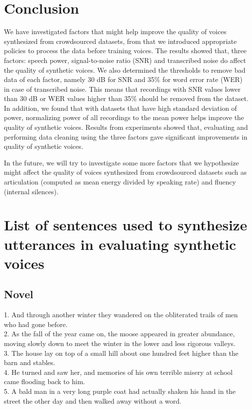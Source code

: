 \documentclass[12pt]{article}
\begin{document}
\section{Conclusion}\label{sec_conclusion}
We have investigated factors that might help improve the quality of voices synthesized from crowdsourced datasets, from that we introduced appropriate policies to process the data before training voices. The results showed that, three factors: speech power, signal-to-noise ratio (SNR) and transcribed noise do affect the quality of synthetic voices. We also determined the thresholds to remove bad data of each factor, namely 30 dB for SNR and 35\% for word error rate (WER) in case of transcribed noise. This means that recordings with SNR values lower than 30 dB or WER values higher than 35\% should be removed from the dataset. In addition, we found that with datasets that have high standard deviation of power, normalizing power of all recordings to the mean power helps improve the quality of synthetic voices. Results from experiments showed that, evaluating and performing data cleaning using the three factors gave significant improvements in quality of synthetic voices.

In the future, we will try to investigate some more factors that we hypothesize might affect the quality of voices synthesized from crowdsourced datasets such as articulation (computed as mean energy divided by speaking rate) and fluency (internal silences).

\clearpage
\appendix
\setcounter{secnumdepth}{0}
\section{List of sentences used to synthesize utterances in evaluating synthetic voices}\label{sec_appendix}

\subsection{Novel}
1.	And through another winter they wandered on the obliterated trails of men who had gone before.\\
2.	As the fall of the year came on, the moose appeared in greater abundance, moving slowly down to meet the winter in the lower and less rigorous valleys.\\
3.	The house lay on top of a small hill about one hundred feet higher than the barn and stables.\\
4.	He turned and saw her, and memories of his own terrible misery at school came flooding back to him.\\
5.	A bald man in a very long purple coat had actually shaken his hand in the street the other day and then walked away without a word.
\end{document}
